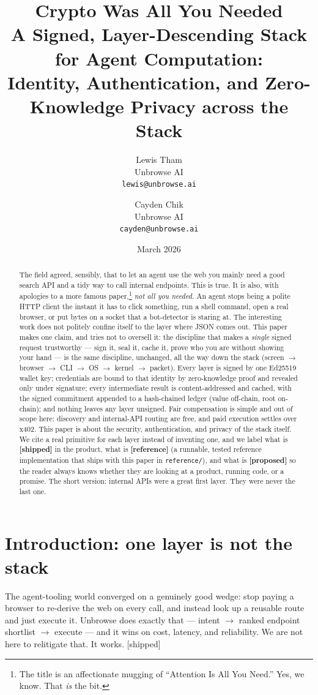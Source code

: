 \documentclass[11pt]{article}
\title{\textbf{Crypto Was All You Needed}\\
\large A Signed, Layer-Descending Stack for Agent Computation:\\
Identity, Authentication, and Zero-Knowledge Privacy across the Stack}
\author{Lewis Tham\\ Unbrowse AI \\ \texttt{lewis@unbrowse.ai}
  \and Cayden Chik\\ Unbrowse AI \\ \texttt{cayden@unbrowse.ai}}
\date{March 2026}
\newcommand{\impl}{\textcolor{green!55!black}{\small[shipped]}}
\begin{document}
\maketitle

\begin{abstract}
The field agreed, sensibly, that to let an agent use the web you mainly need a
good search API and a tidy way to call internal endpoints. This is true. It is
also, with apologies to a more famous paper,\footnote{The title is an affectionate
mugging of ``Attention Is All You Need.'' Yes, we know. That \emph{is} the bit.}
\emph{not all you needed.} An agent stops being a polite HTTP client the instant
it has to click something, run a shell command, open a real browser, or put bytes
on a socket that a bot-detector is staring at. The interesting work does not
politely confine itself to the layer where JSON comes out. This paper makes one
claim, and tries not to oversell it: the discipline that makes a \emph{single}
signed request trustworthy --- sign it, seal it, cache it, prove who you are
without showing your hand --- is the same discipline, unchanged, all the way down
the stack (screen $\to$ browser $\to$ CLI $\to$ OS $\to$ kernel $\to$ packet).
Every layer is signed by one Ed25519 wallet key; credentials are bound to that
identity by zero-knowledge proof and revealed only under signature; every
intermediate result is content-addressed and cached, with the signed commitment
appended to a hash-chained ledger (value off-chain, root on-chain); and nothing
leaves any layer unsigned. Fair compensation is simple and out of scope here:
discovery and internal-API routing are free, and paid execution settles over x402.
This paper is about the security, authentication, and
privacy of the stack itself. We cite a real primitive for
each layer instead of inventing one, and we label what is \textbf{[shipped]} in
the product, what is \textbf{[reference]} (a runnable, tested reference
implementation that ships with this paper in \texttt{reference/}), and what is
\textbf{[proposed]} so the reader always knows whether they are looking at a
product, running code, or a promise. The short version: internal APIs were a
great first layer. They were never the last one.
\end{abstract}

\section{Introduction: one layer is not the stack}

The agent-tooling world converged on a genuinely good wedge: stop paying a browser
to re-derive the web on every call, and instead look up a reusable route and just
execute it. Unbrowse does exactly that --- intent $\to$ ranked
endpoint shortlist $\to$ execute --- and it wins on cost, latency, and
reliability. We are not here to relitigate that. It works. \impl{}
\end{document}

